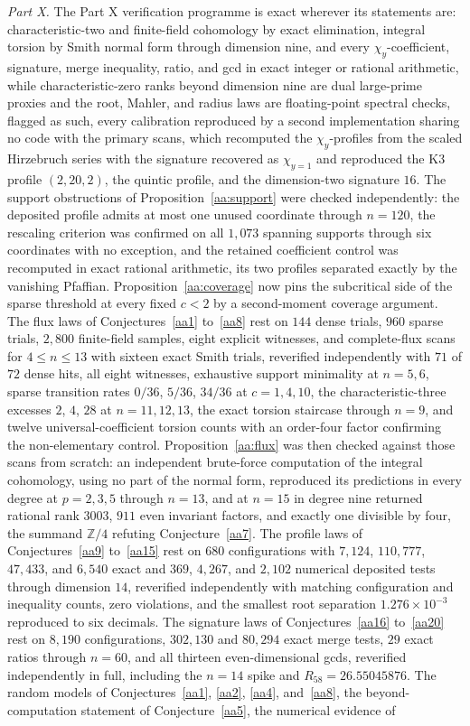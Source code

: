 \documentclass[11pt]{article}
\theoremstyle{definition}
\newcommand{\Z}{\mathbb Z}
\providecommand{\Z}{\mathbb Z}
\begin{document}
\emph{Part X.}  The Part X verification programme is exact wherever its statements are: characteristic-two and finite-field cohomology by exact elimination, integral torsion by Smith normal form through dimension nine, and every $\chi_y$-coefficient, signature, merge inequality, ratio, and gcd in exact integer or rational arithmetic, while characteristic-zero ranks beyond dimension nine are dual large-prime proxies and the root, Mahler, and radius laws are floating-point spectral checks, flagged as such, every calibration reproduced by a second implementation sharing no code with the primary scans, which recomputed the $\chi_y$-profiles from the scaled Hirzebruch series with the signature recovered as $\chi_{y=1}$ and reproduced the K3 profile $(2,20,2)$, the quintic profile, and the dimension-two signature $16$.  The support obstructions of Proposition~\ref{aa:support} were checked independently: the deposited profile admits at most one unused coordinate through $n=120$, the rescaling criterion was confirmed on all $1{,}073$ spanning supports through six coordinates with no exception, and the retained coefficient control was recomputed in exact rational arithmetic, its two profiles separated exactly by the vanishing Pfaffian.  Proposition~\ref{aa:coverage} now pins the subcritical side of the sparse threshold at every fixed $c<2$ by a second-moment coverage argument.  The flux laws of Conjectures~\ref{aa1} to~\ref{aa8} rest on $144$ dense trials, $960$ sparse trials, $2{,}800$ finite-field samples, eight explicit witnesses, and complete-flux scans for $4\le n\le13$ with sixteen exact Smith trials, reverified independently with $71$ of $72$ dense hits, all eight witnesses, exhaustive support minimality at $n=5,6$, sparse transition rates $0/36$, $5/36$, $34/36$ at $c=1,4,10$, the characteristic-three excesses $2$, $4$, $28$ at $n=11,12,13$, the exact torsion staircase through $n=9$, and twelve universal-coefficient torsion counts with an order-four factor confirming the non-elementary control.  Proposition~\ref{aa:flux} was then checked against those scans from scratch: an independent brute-force computation of the integral cohomology, using no part of the normal form, reproduced its predictions in every degree at $p=2,3,5$ through $n=13$, and at $n=15$ in degree nine returned rational rank $3003$, $911$ even invariant factors, and exactly one divisible by four, the summand $\Z/4$ refuting Conjecture~\ref{aa7}.  The profile laws of Conjectures~\ref{aa9} to~\ref{aa15} rest on $680$ configurations with $7{,}124$, $110{,}777$, $47{,}433$, and $6{,}540$ exact and $369$, $4{,}267$, and $2{,}102$ numerical deposited tests through dimension $14$, reverified independently with matching configuration and inequality counts, zero violations, and the smallest root separation $1.276\times10^{-3}$ reproduced to six decimals.  The signature laws of Conjectures~\ref{aa16} to~\ref{aa20} rest on $8{,}190$ configurations, $302{,}130$ and $80{,}294$ exact merge tests, $29$ exact ratios through $n=60$, and all thirteen even-dimensional gcds, reverified independently in full, including the $n=14$ spike and $R_{58}=26.55045876$.  The random models of Conjectures~\ref{aa1}, \ref{aa2}, \ref{aa4}, and~\ref{aa8}, the beyond-computation statement of Conjecture~\ref{aa5}, the numerical evidence of 
\end{document}
